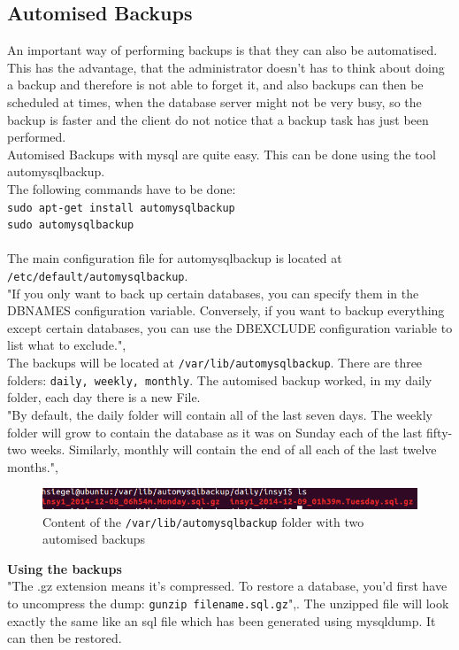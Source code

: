 \documentclass[10pt]{article}
\begin{document}
\subsection{Automised Backups}
An important way of performing backups is that they can also be automatised. This has the advantage, that the administrator doesn't has to think about doing a backup and therefore is not able to forget it, and also backups can then be scheduled at times, when the database server might not be very busy, so the backup is faster and the client do not notice that a backup task has just been performed.  \\
Automised Backups with mysql are quite easy. This can be done using the tool automysqlbackup. \\
The following commands have to be done: \\
\texttt{sudo apt-get install automysqlbackup} \\
\texttt{sudo automysqlbackup} \\ \\
The main configuration file for automysqlbackup is located at \texttt{/etc/default/automysqlbackup}. \\
"If you only want to back up certain databases, you can specify them in the DBNAMES configuration variable. Conversely, if you want to backup everything except certain databases, you can use the DBEXCLUDE configuration variable to list what to exclude.",\cite{sceduleddbbck} \\
The backups will be located at \texttt{/var/lib/automysqlbackup}. There are three folders: \texttt{daily, weekly, monthly}.
The automised backup worked, in my daily folder, each day there is a new File.\\
"By default, the daily folder will contain all of the last seven days. The weekly folder will grow to contain the database as it was on Sunday each of the last fifty-two weeks. Similarly, monthly will contain the end of all each of the last twelve months.",\cite{sceduleddbbck}
\begin{figure}[!h]
	\begin{center}
		\includegraphics[width=1.0\linewidth]{pictures/mysql_autobackup}
		\caption{Content of the \texttt{/var/lib/automysqlbackup} folder with two automised backups}
		\label{content}
	\end{center}
\end{figure}
\FloatBarrier
\textbf{Using the backups}\\
"The .gz extension means it's compressed. To restore a database, you'd first have to uncompress the dump:
\texttt{gunzip filename.sql.gz}",\cite{uglywebpage}. The unzipped file will look exactly the same like an sql file which has been generated using mysqldump. It can then be restored.
\end{document}
